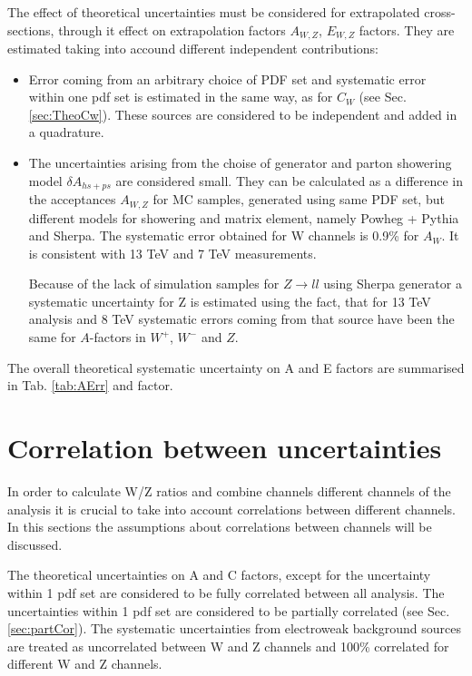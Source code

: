 The effect of theoretical uncertainties must be considered for extrapolated cross-sections, through it effect on extrapolation factors $A_{W,Z}$, $E_{W,Z}$  factors. They are estimated taking into accound different independent contributions:
\begin{itemize}
\item  Error coming from an arbitrary choice of PDF set and systematic error within one pdf set is estimated in the same way, as for $C_W$ (see Sec. \ref{sec:TheoCw}). These sources are considered to be independent and added in a quadrature. 

\item The uncertainties arising from the choise of generator and parton showering model $\delta A_{hs+ps}$ are considered small. They can be calculated as a difference in the acceptances  $A_{W,Z}$ for MC samples, generated using same PDF set, but different models for showering and matrix element, namely Powheg + Pythia and Sherpa. The systematic error obtained for W channels is 0.9\% for $A_{W}$. It is consistent with 13 TeV and 7 TeV measurements.

 Because of the lack of simulation samples for $Z\to ll$ using Sherpa generator a systematic uncertainty for Z is estimated using the fact, that for 13 TeV analysis and 8 TeV systematic errors coming from that source have been the same for $A$-factors in $W^{+}$, $W^-$ and $Z$.
\end{itemize}

The overall theoretical systematic uncertainty on A and E factors are summarised in Tab. \ref{tab:AErr} and  factor.


 
\section{Correlation between uncertainties}\label{sec:Cor}

In order to calculate W/Z ratios and combine channels different channels of the analysis it is crucial to take into account correlations between different channels. In this sections the assumptions about correlations between channels will be discussed.

The theoretical uncertainties on A and C factors, except for the uncertainty within 1 pdf set are considered to be fully correlated between all analysis. The uncertainties within 1 pdf set are considered to be partially correlated (see Sec. \ref{sec:partCor}). The systematic uncertainties from electroweak background sources are treated as uncorrelated between W and Z channels and 100\% correlated for different W and Z channels.  

